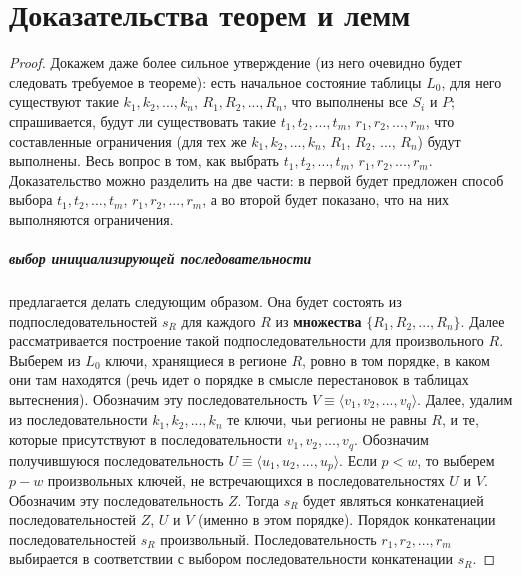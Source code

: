 \chapter{Доказательства теорем и лемм}\label{sec:proofs}

\theoremtext{\ref{mirror_fullness}}{\FullnessMirror}
\begin{proof}
Докажем даже более сильное утверждение (из него очевидно будет следовать требуемое в теореме): есть начальное состояние таблицы $L_0$, для него существуют такие $k_1, k_2, ..., k_n$, $R_1, R_2, ..., R_n$, что выполнены все $S_i$ и $P$; спрашивается, будут ли существовать такие $t_1, t_2, ..., t_m$, $r_1, r_2, ..., r_m$, что составленные ограничения (для тех же $k_1, k_2, ..., k_n$, $R_1$, $R_2$, ..., $R_n$) будут выполнены. Весь вопрос в том, как выбрать $t_1, t_2, ..., t_m$, $r_1, r_2, ..., r_m$. Доказательство можно разделить на две части: в первой будет предложен способ выбора $t_1, t_2, ..., t_m$, $r_1, r_2, ..., r_m$, а во второй будет показано, что на них выполняются ограничения.

\paragraph{выбор инициализирующей последовательности} предлагается делать следующим образом. Она будет состоять из подпоследовательностей $s_R$ для каждого $R$ из \textbf{множества} $\{R_1, R_2, ..., R_n\}$. Далее рассматривается построение такой подпоследовательности для произвольного $R$. Выберем из $L_0$ ключи, хранящиеся в регионе $R$, ровно в том порядке, в каком они там находятся (речь идет о порядке в смысле перестановок в таблицах вытеснения). Обозначим эту последовательность $V \equiv \langle v_1, v_2, ..., v_q \rangle$. Далее, удалим из последовательности $k_1, k_2, ..., k_n$ те ключи, чьи регионы не равны $R$, и те, которые присутствуют в последовательности $v_1, v_2, ..., v_q$. Обозначим получившуюся последовательность $U \equiv \langle u_1, u_2, ..., u_p\rangle$. Если $p < w$, то выберем $p{-}w$ произвольных ключей, не встречающихся в последовательностях $U$ и $V$. Обозначим эту последовательность $Z$. Тогда $s_R$ будет являться конкатенацией последовательностей $Z$, $U$ и $V$ (именно в этом порядке). Порядок конкатенации последовательностей $s_R$ произвольный. Последовательность $r_1, r_2, ..., r_m$ выбирается в соответствии с выбором последовательности конкатенации $s_R$.


\end{proof}
